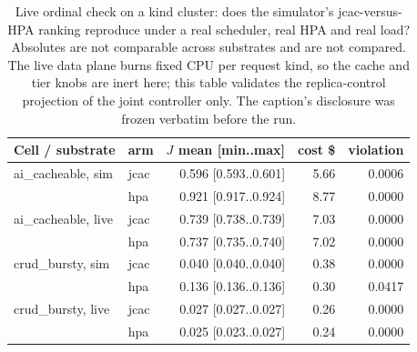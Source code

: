 \begin{table}[htbp]
\centering\tablefont
\begin{tabular}{@{}llrrr@{}}
\toprule
\textbf{Cell / substrate} & \textbf{arm} & $J$ \textbf{mean [min..max]} & \textbf{cost \$} & \textbf{violation} \\
\midrule
ai\_cacheable, sim  & jcac & 0.596 [0.593..0.601] & 5.66 & 0.0006 \\
                    & hpa  & 0.921 [0.917..0.924] & 8.77 & 0.0000 \\
ai\_cacheable, live & jcac & 0.739 [0.738..0.739] & 7.03 & 0.0000 \\
                    & hpa  & 0.737 [0.735..0.740] & 7.02 & 0.0000 \\
\addlinespace
crud\_bursty, sim   & jcac & 0.040 [0.040..0.040] & 0.38 & 0.0000 \\
                    & hpa  & 0.136 [0.136..0.136] & 0.30 & 0.0417 \\
crud\_bursty, live  & jcac & 0.027 [0.027..0.027] & 0.26 & 0.0000 \\
                    & hpa  & 0.025 [0.023..0.027] & 0.24 & 0.0000 \\
\bottomrule
\end{tabular}
\caption{Live ordinal check on a kind cluster: does the simulator's
jcac-versus-HPA ranking reproduce under a real scheduler, real HPA and real
load? Absolutes are not comparable across substrates and are not compared.
The live data plane burns fixed CPU per request kind, so the cache and tier
knobs are inert here; this table validates the replica-control projection
of the joint controller only. The caption's disclosure was frozen verbatim
before the run.}
\label{tab:ordinal}
\end{table}

